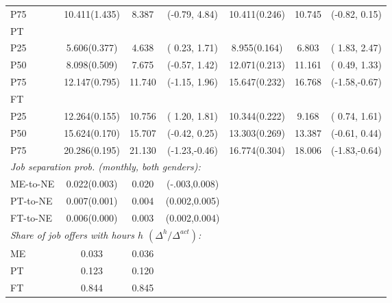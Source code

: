 \begin{tabular}{lcccccc}
P75 &       10.411\quad (1.435) &        8.387& (-0.79, 4.84) &       10.411\quad (0.246) &       10.745& (-0.82, 0.15) \\
\multicolumn{7}{l}{PT}   \\ 
P25 &        5.606\quad (0.377) &        4.638& ( 0.23, 1.71) &        8.955\quad (0.164) &        6.803& ( 1.83, 2.47) \\
P50 &        8.098\quad (0.509) &        7.675& (-0.57, 1.42) &       12.071\quad (0.213) &       11.161& ( 0.49, 1.33) \\
P75 &       12.147\quad (0.795) &       11.740& (-1.15, 1.96) &       15.647\quad (0.232) &       16.768& (-1.58,-0.67) \\
\multicolumn{7}{l}{FT}   \\ 
P25 &       12.264\quad (0.155) &       10.756& ( 1.20, 1.81) &       10.344\quad (0.222) &        9.168& ( 0.74, 1.61) \\
P50 &       15.624\quad (0.170) &       15.707& (-0.42, 0.25) &       13.303\quad (0.269) &       13.387& (-0.61, 0.44) \\
P75 &       20.286\quad (0.195) &       21.130& (-1.23,-0.46) &       16.774\quad (0.304) &       18.006& (-1.83,-0.64) \\
	\multicolumn{7}{l}{\textit{Job separation prob. (monthly, both genders):}}   \\ 
ME-to-NE &        0.022\quad (0.003) &        0.020& (-.003,0.008) & & & \\
PT-to-NE &        0.007\quad (0.001) &        0.004& (0.002,0.005) & & & \\
FT-to-NE &        0.006\quad (0.000) &        0.003& (0.002,0.004) & & & \\
	  \multicolumn{7}{l}{\textit{Share of job offers with hours $h$ $(\Delta^h/\Delta^{act})$:}}   \\ 
	ME & 0.033 \hspace{1.5cm} & 0.036 & & && \\
	PT & 0.123 \hspace{1.5cm} & 0.120 & &&& \\
	FT & 0.844 \hspace{1.5cm} & 0.845 & &&& \\
	\hline\hline 
\end{tabular} 
